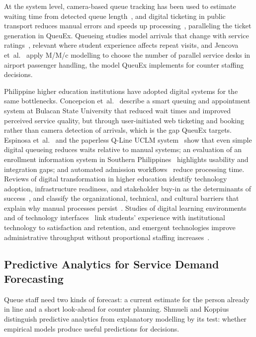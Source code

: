 \documentclass{research}
\newcommand{\sysname}{QueuEx}
\begin{document}
At the system level, camera-based queue tracking has been used to
estimate waiting time from detected queue
length~\cite{rrlcomp008realtimequeue}, and digital ticketing in public
transport reduces manual errors and speeds up
processing~\cite{rrlcomp056efficientpublictransport}, paralleling the
ticket generation in \sysname{}. Queueing studies model arrivals that
change with service ratings~\cite{rrlcomp067selfservicerating}, relevant
where student experience affects repeat visits, and Jencova
et~al.~\cite{rrlcomp068dimensioningoptimalnumber} apply M/M/c modelling
to choose the number of parallel service desks in airport passenger
handling, the model \sysname{} implements for counter staffing
decisions.

Philippine higher education institutions have adopted digital systems
for the same bottlenecks. Concepcion et~al.~\cite{concepcion2026smart}
describe a smart queuing and appointment system at Bulacan State
University that reduced wait times and improved perceived service
quality, but through user-initiated web ticketing and booking rather
than camera detection of arrivals, which is the gap \sysname{} targets.
Espinosa et~al.~\cite{rrlcomp023automatedenrollmentqueueing} and the
paperless Q-Line UCLM system~\cite{rrlcomp025lineuclmenhancing} show
that even simple digital queueing reduces waits relative to manual
systems; an evaluation of an enrollment information system in Southern
Philippines~\cite{rrlcomp041evaluationimprovementhei} highlights
usability and integration gaps; and automated admission
workflows~\cite{rrlcomp083automationclientservicing} reduce processing
time. Reviews of digital transformation in higher education identify
technology adoption, infrastructure readiness, and stakeholder buy-in as
the determinants of success~\cite{rrlcomp082digitaltransformationhigher},
and classify the organizational, technical, and cultural barriers that
explain why manual processes
persist~\cite{rrlcomp080classificationbarriersdigital}. Studies of
digital learning environments~\cite{rrlcomp081digitallearningdigital}
and of technology interfaces~\cite{rrlcomp085technologyinterfacestudent}
link students' experience with institutional technology to satisfaction
and retention, and emergent technologies improve administrative
throughput without proportional staffing
increases~\cite{rrlcomp084supportingeducationaladministration}.

\subsection{Predictive Analytics for Service Demand Forecasting}
Queue staff need two kinds of forecast: a current estimate for the
person already in line and a short look-ahead for counter planning.
Shmueli and Koppius~\cite{shmueli2011predictive} distinguish predictive
analytics from explanatory modelling by its test: whether empirical
models produce useful predictions for decisions.
\end{document}
